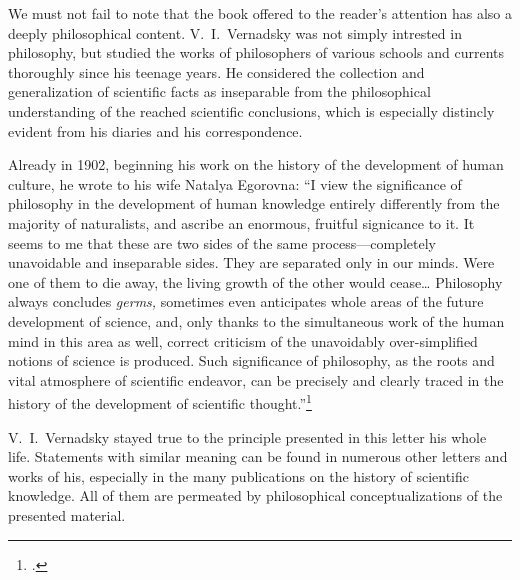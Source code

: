 We must not fail to note that the book offered to the reader's attention has
also a deeply philosophical content.  V.\ I.\ Vernadsky was not simply
intrested in philosophy, but studied the works of philosophers of various
schools and currents thoroughly since his teenage years.  He considered the
collection and generalization of scientific facts as inseparable from the
philosophical understanding of the reached scientific conclusions, which is
especially distincly evident from his diaries and his correspondence.

Already in 1902, beginning his work on the history of the development of human
culture, he wrote to his wife Natalya Egorovna: ``I view the significance of
philosophy in the development of human knowledge entirely differently from the
majority of naturalists, and ascribe an enormous, fruitful signicance to it.
It seems to me that these are two sides of the same process---completely
unavoidable and inseparable sides.  They are separated only in our minds.  Were
one of them to die away, the living growth of the other would cease\dots{}
Philosophy always concludes \emph{germs, }sometimes even anticipates whole
areas of the future development of science, and, only thanks to the
simultaneous work of the human mind in this area as well, correct criticism of
the unavoidably over-simplified notions of science is produced.  Such
significance of philosophy, as the roots and vital atmosphere of scientific
endeavor, can be precisely and clearly traced in the history of the development
of scientific thought.''\footcite{vernadsky1988trudy-p21}

V.\ I.\ Vernadsky stayed true to the principle presented in this letter his
whole life.  Statements with similar meaning can be found in numerous other
letters and works of his, especially in the many publications on the history of
scientific knowledge.  All of them are permeated by philosophical
conceptualizations of the presented material.

